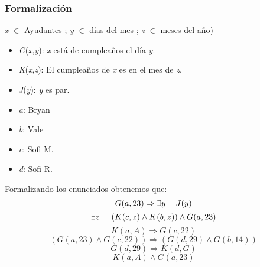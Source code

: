 \documentclass[letterpaper,10pt]{article}
\begin{document}
\subsubsection*{Formalizaci\'on}
\begin{minipage}[t]{0.6\textwidth}
    \textit{x} \(\in\) Ayudantes ; \textit{y} \(\in\) d\'ias del mes ; \textit{z} \(\in\) meses del año)
\begin{itemize}
    \item \textit{G}(\textit{x},\textit{y}): \textit{x} est\'a de cumpleaños el d\'ia \textit{y}.
    \item \textit{K}(\textit{x},\textit{z}): El cumpleaños de \textit{x} es en el mes de \textit{z}.
    \item \textit{J}(\textit{y}): \textit{y} es par.
    \item \textit{a}: Bryan
    \item \textit{b}: Vale
    \item \textit{c}: Sofi M.
    \item \textit{d}: Sofi R.
\end{itemize}
\end{minipage}
\begin{minipage}[t]{0.48\textwidth}
\hspace{3mm}Formalizando los enunciados obtenemos que:
\begin{equation}
    G(a,23) \Rightarrow \exists y \hspace{2mm} \neg J(y)
\end{equation}
\begin{equation}
    \exists z \hspace{5mm} (K(c,z) \wedge K(b,z)) \wedge G(a,23)
\end{equation}
\begin{equation}
    K(a,A) \Rightarrow G(c,22)
\end{equation}
\begin{equation}
    (G(a,23) \wedge G(c, 22)) \Rightarrow (G(d,29) \wedge G(b,14))
\end{equation}
\begin{equation}
    G(d,29) \Rightarrow K(d,G)
\end{equation}
\begin{equation}
    K(a,A) \wedge G(a,23)
\end{equation}
\end{minipage}
\end{document}
